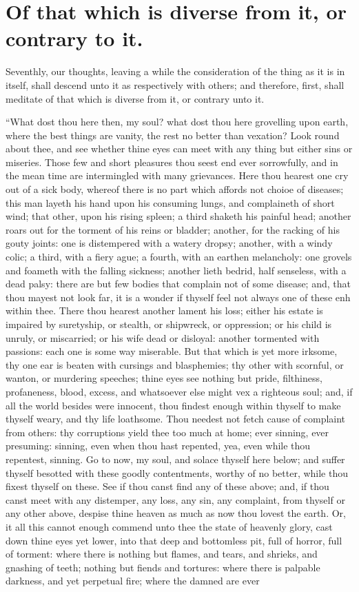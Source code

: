 \section{Of that which is diverse from it, or contrary to it.}

Seventhly, our thoughts, leaving a while the consideration of the thing as it is in itself, shall descend unto it as respectively with others; and therefore, first, shall meditate of that which is diverse from it, or contrary unto it. 

``What dost thou here then, my soul? what dost thou here grovelling upon earth, where the best things are vanity, the rest no better than vexation? Look round about thee, and see whether thine eyes can meet with any thing but either sins or miseries. Those few and short pleasures thou seest end ever sorrowfully, and in the mean time are intermingled with many grievances. Here thou hearest one cry out of a sick body, whereof there is no part which affords not choioe of diseases; this man layeth his hand upon his consuming lungs, and complaineth of short wind; that other, upon his rising spleen; a third shaketh his painful head; another roars out for the torment of his reins or bladder; another, for the racking of his gouty joints: one is distempered with a watery dropsy; another, with a windy colic; a third, with a fiery ague; a fourth, with an earthen melancholy: one grovels and foameth with the falling sickness; another lieth bedrid, half senseless, with a dead palsy: there are but few bodies that complain not of some disease; and, that thou mayest not look far, it is a wonder if thyself feel not always one of these enh within thee. There thou hearest another lament his loss; either his estate is impaired by suretyship, or stealth, or shipwreck, or oppression; or his child is unruly, or miscarried; or his wife dead or disloyal: another tormented with passions: each one is some way miserable. But that which is yet more irksome, thy one ear is beaten with cursings and blasphemies; thy other with scornful, or wanton, or murdering speeches; thine eyes see nothing but pride, filthiness, profaneness, blood, excess, and whatsoever else might vex a righteous soul; and, if all the world besides were innocent, thou findest enough within thyself to make thyself weary, and thy life loathsome. Thou needest not fetch cause of complaint from others: thy corruptions yield thee too much at home; ever sinning, ever presuming: sinning, even when thou hast repented, yea, even while thou repentest, sinning. Go to now, my soul, and solace thyself here below; and suffer thyself besotted with these goodly contentments, worthy of no better, while thou fixest thyself on these. See if thou canst find any of these above; and, if thou canst meet with any distemper, any loss, any sin, any complaint, from thyself or any other above, despise thine heaven as much as now thou lovest the earth. Or, it all this cannot enough commend unto thee the state of heavenly glory, cast down thine eyes yet lower, into that deep and bottomless pit, full of horror, full of torment: where there is nothing but flames, and tears, and shrieks, and gnashing of teeth; nothing but fiends and tortures: where there is palpable darkness, and yet perpetual fire; where the damned are ever 